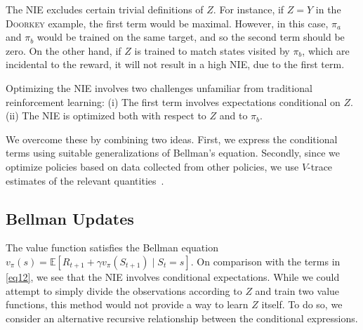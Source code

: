 \documentclass[letterpaper]{article} %
\newcommand{\EE}{\mathbb{E}}
\newcommand{\NIE}{\textrm{NIE}\xspace}
\newcommand{\doorkey}{\textsc{Doorkey}\xspace}
\begin{document}
	The \NIE excludes certain trivial definitions of $Z$. For instance, if $Z=Y$ in the \doorkey example, the first term would be maximal. However, in this case, $\pi_a$ and $\pi_b$ would be trained on the same target, and so the second term should be zero. On the other hand, if $Z$ is trained to match states visited by $\pi_b$, which are incidental to the reward, it will not result in a high \NIE, due to the first term. %


	Optimizing the \NIE involves two challenges unfamiliar from traditional reinforcement learning: (i)  %
	The first term involves expectations conditional on $Z$. %
	(ii) %
	The \NIE is optimized both with respect to $Z$ and to $\pi_b$.


	We overcome these by combining two ideas. First, we express the conditional terms using suitable generalizations of Bellman's equation. %
	Secondly, since we optimize policies based on data collected from other policies, we use $V$-trace estimates of the relevant quantities~\cite{espeholt2018impala}.

	\subsection{Bellman Updates}
	The value function satisfies the Bellman equation $v_\pi(s) = \EE\left[R_{t+1} + \gamma v_\pi(S_{t+1}) \mid S_t = s\right]$. On comparison with the terms in \cref{eq12}, we see that the \NIE involves conditional expectations.
	While we could attempt to simply divide the observations according to $Z$ and train two value functions, this method would not provide a way to learn $Z$ itself. To do so, we consider an alternative recursive relationship between the conditional expressions. %
\end{document}
